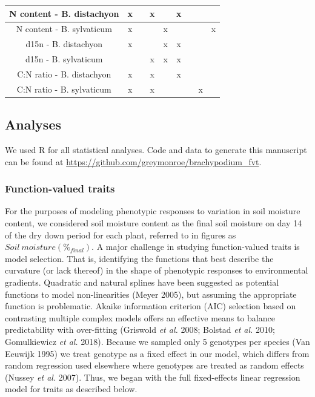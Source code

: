 \documentclass[jou,floatsintext]{apa6}
\begin{document}
\begin{table}[tbp]
\begin{center}
\begin{threeparttable}
{\begin{tabular}{ccccccccc}
N content - B. distachyon & x &  & x &  & x &  &  & \\ \midrule
N content - B. sylvaticum & x &  &  & x &  &  &  & x\\ \midrule
d15n - B. distachyon & x &  &  & x & x &  &  & \\ \midrule
d15n - B. sylvaticum &  &  & x & x & x &  &  & \\ \midrule
C:N ratio - B. distachyon & x &  & x &  & x &  &  & \\ \midrule
C:N ratio - B. sylvaticum & x &  & x &  &  &  & x & \\ \midrule
\bottomrule
\end{tabular}
}
\end{threeparttable}
\end{center}
\end{table}

\hypertarget{analyses}{%
\subsection{Analyses}\label{analyses}}

We used R for all statistical analyses. Code and data to generate this manuscript can be found at \url{https://github.com/greymonroe/brachypodium_fvt}.

\hypertarget{function-valued-traits}{%
\subsubsection{Function-valued traits}\label{function-valued-traits}}

For the purposes of modeling phenotypic responses to variation in soil moisture content, we considered soil moisture content as the final soil moisture on day 14 of the dry down period for each plant, referred to in figures as \(Soil\ moisture (\%_{final})\). A major challenge in studying function-valued traits is model selection. That is, identifying the functions that best describe the curvature (or lack thereof) in the shape of phenotypic responses to environmental gradients. Quadratic and natural splines have been suggested as potential functions to model non-linearities (Meyer 2005), but assuming the appropriate function is problematic. Akaike information criterion (AIC) selection based on contrasting multiple complex models offers an effective means to balance predictability with over-fitting (Griswold \emph{et al.} 2008; Bolstad \emph{et al.} 2010; Gomulkiewicz \emph{et al.} 2018). Because we sampled only 5 genotypes per species (Van Eeuwijk 1995) we treat genotype as a fixed effect in our model, which differs from random regression used elsewhere where genotypes are treated as random effects (Nussey \emph{et al.} 2007). Thus, we began with the full fixed-effects linear regression model for traits as described below.
\end{document}
